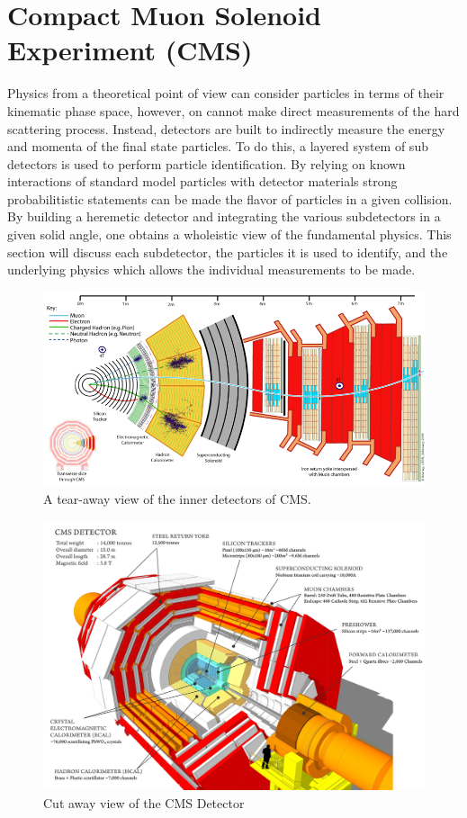 \section{Compact Muon Solenoid Experiment (CMS)}

Physics from a theoretical point of view can consider particles in terms of their kinematic 
phase space, however, on cannot make direct measurements of the hard scattering process. Instead,
detectors are built to indirectly measure the energy and momenta of the final state particles.
To do this, a layered system of sub detectors is used to perform particle identification. By relying on known interactions of standard model particles with detector materials 
strong probabilitistic statements can be made the flavor of particles in a given collision. 
By building a heremetic detector and integrating the various subdetectors in a given 
solid angle, one obtains a wholeistic view of the fundamental physics.
This section will discuss each subdetector, the particles it is used to identify, and the 
underlying physics which allows the individual measurements to be made.


\begin{figure}
\begin{center}
\includegraphics[width=.95\textwidth]{pics/cms_transverse}
\end{center}
\caption{ A tear-away view of the inner detectors of CMS.}
\label{fig:cms_transverse}
\end{figure}

\begin{figure}
\begin{center}
\includegraphics[width=.90\textwidth]{pics/cut_away_view}
\end{center}
\caption{Cut away view of the CMS Detector}
\label{fig:cms_onion}
\end{figure}

